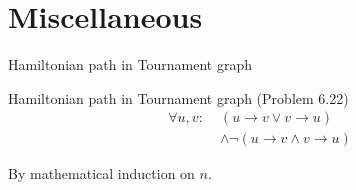\section{Miscellaneous}

\begin{frame}{Hamiltonian path in Tournament graph}
  \begin{exampleblock}{Hamiltonian path in Tournament graph (Problem 6.22)}
	\begin{align*}
	  \forall u, v:\; &(u \to v \lor v \to u) \\
	  	&\land \lnot (u \to v \land v \to u)
	\end{align*}
  \end{exampleblock}

  \vspace{0.60cm}
  \centerline{By mathematical induction on $n$.}
\end{frame}
